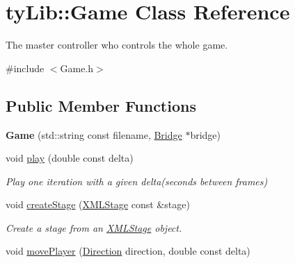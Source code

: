 \hypertarget{classty_lib_1_1_game}{}\section{ty\+Lib\+:\+:Game Class Reference}
\label{classty_lib_1_1_game}


The master controller who controls the whole game.  




{\ttfamily \#include $<$Game.\+h$>$}

\subsection*{Public Member Functions}
\begin{DoxyCompactItemize}
\item 
\hypertarget{classty_lib_1_1_game_a3826bff41f496de75cdd0fd9a4abe2f2}{}{\bfseries Game} (std\+::string const filename, \hyperlink{classty_lib_1_1_bridge}{Bridge} $\ast$bridge)\label{classty_lib_1_1_game_a3826bff41f496de75cdd0fd9a4abe2f2}

\item 
\hypertarget{classty_lib_1_1_game_ac509d35039339b4d34623f3d6999685c}{}void \hyperlink{classty_lib_1_1_game_ac509d35039339b4d34623f3d6999685c}{play} (double const delta)\label{classty_lib_1_1_game_ac509d35039339b4d34623f3d6999685c}

\begin{DoxyCompactList}\small\item\em Play one iteration with a given delta(seconds between frames) \end{DoxyCompactList}\item 
\hypertarget{classty_lib_1_1_game_ac909c1e6a6dc5ec2d5c9cce4769c5511}{}void \hyperlink{classty_lib_1_1_game_ac909c1e6a6dc5ec2d5c9cce4769c5511}{create\+Stage} (\hyperlink{structty_lib_1_1_x_m_l_stage}{X\+M\+L\+Stage} const \&stage)\label{classty_lib_1_1_game_ac909c1e6a6dc5ec2d5c9cce4769c5511}

\begin{DoxyCompactList}\small\item\em Create a stage from an \hyperlink{structty_lib_1_1_x_m_l_stage}{X\+M\+L\+Stage} object. \end{DoxyCompactList}\item 
\hypertarget{classty_lib_1_1_game_a73b72e8cc20e916239f5e45a65cf6e86}{}void \hyperlink{classty_lib_1_1_game_a73b72e8cc20e916239f5e45a65cf6e86}{move\+Player} (\hyperlink{classty_lib_1_1_direction}{Direction} direction, double const delta)\label{classty_lib_1_1_game_a73b72e8cc20e916239f5e45a65cf6e86}


\end{DoxyCompactItemize}

